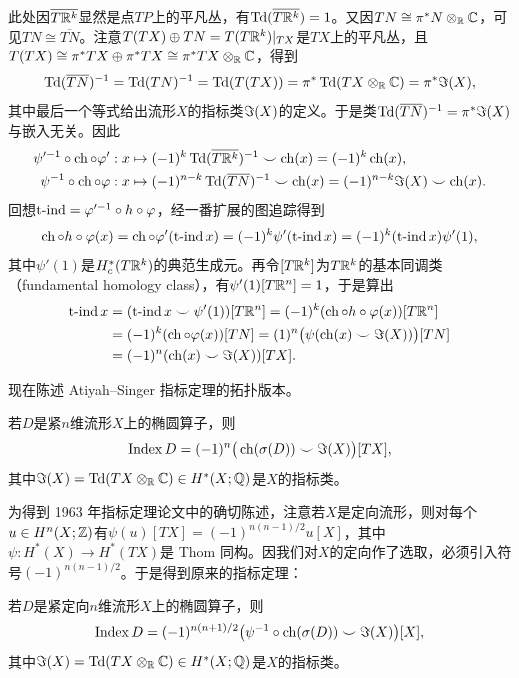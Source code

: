 此处因$\overline{T\mathbb{R}^k}$显然是点$TP$上的平凡丛，有$\operatorname{Td}(\overline{T\mathbb{R}^k})=1$。又因$TN\cong\pi^*N\otimes_{\mathbb{R}}\mathbb{C}$，可见$TN\cong\overline{TN}$。注意$T(TX)\oplus TN=T(T\mathbb{R}^k)|_{TX}$是$TX$上的平凡丛，且$T(TX)\cong\pi^*TX\oplus\pi^*TX\cong\pi^*TX\otimes_{\mathbb{R}}\mathbb{C}$，得到
\[
\operatorname{Td}(\overline{TN})^{-1}=\operatorname{Td}(TN)^{-1}=\operatorname{Td}(T(TX))=\pi^*\operatorname{Td}(TX\otimes_{\mathbb{R}}\mathbb{C})=\pi^*\Im(X),
\]
其中最后一个等式给出流形$X$的指标类$\Im(X)$的定义。于是类$\operatorname{Td}(\overline{TN})^{-1}=\pi^*\Im(X)$与嵌入无关。因此
\begin{align*}
\psi'^{-1}\circ\operatorname{ch}\circ\varphi'&:x\mapsto(-1)^k\operatorname{Td}(\overline{T\mathbb{R}^k})^{-1}\smile\operatorname{ch}(x)=(-1)^k\operatorname{ch}(x),\\
\psi^{-1}\circ\operatorname{ch}\circ\varphi&:x\mapsto(-1)^{n-k}\operatorname{Td}(\overline{TN})^{-1}\smile\operatorname{ch}(x)=(-1)^{n-k}\Im(X)\smile\operatorname{ch}(x).
\end{align*}
回想$\operatorname{t\text{-}ind}=\varphi'^{-1}\circ h\circ\varphi$，经一番扩展的图追踪得到
\[
\operatorname{ch}\circ h\circ\varphi(x)=\operatorname{ch}\circ\varphi'(\operatorname{t\text{-}ind} x)=(-1)^k\psi'(\operatorname{t\text{-}ind} x)=(-1)^k(\operatorname{t\text{-}ind} x)\psi'(1),
\]
其中$\psi'(1)$是$H^*_c(T\mathbb{R}^k)$的典范生成元。再令$[T\mathbb{R}^k]$为$T\mathbb{R}^k$的基本同调类（fundamental homology class），有$\psi'(1)[T\mathbb{R}^n]=1$，于是算出
\begin{align*}
\operatorname{t\text{-}ind} x&=(\operatorname{t\text{-}ind} x\smile\psi'(1))[T\mathbb{R}^n]=(-1)^k(\operatorname{ch}\circ h\circ\varphi(x))[T\mathbb{R}^n]\\
&=(-1)^k(\operatorname{ch}\circ\varphi(x))[TN]=(1)^n\big(\psi(\operatorname{ch}(x)\smile\Im(X))\big)[TN]\\
&=(-1)^n(\operatorname{ch}(x)\smile\Im(X))[TX].
\end{align*}


现在陈述 Atiyah–Singer 指标定理的拓扑版本。

\begin{theorem}[指标定理 A]
若$D$是紧$n$维流形$X$上的椭圆算子，则
\[
\operatorname{Index} D=(-1)^n\big(\operatorname{ch}(\sigma(D))\smile\Im(X)\big)[TX],
\]
其中$\Im(X)=\operatorname{Td}(TX\otimes_{\mathbb{R}}\mathbb{C})\in H^*(X;\mathbb{Q})$是$X$的指标类。
\end{theorem}

为得到 1963 年指标定理论文中的确切陈述，注意若$X$是定向流形，则对每个$u\in H^n(X;\mathbb{Z})$有$\psi(u)[TX]=(-1)^{n(n-1)/2}u[X]$，其中$\psi:H^*(X)\to H^*(TX)$是 Thom 同构。因我们对$X$的定向作了选取，必须引入符号$(-1)^{n(n-1)/2}$。于是得到原来的指标定理：

\begin{theorem}[指标定理 B]
若$D$是紧定向$n$维流形$X$上的椭圆算子，则
\[
\operatorname{Index} D=(-1)^{n(n+1)/2}\big(\psi^{-1}\circ\operatorname{ch}(\sigma(D))\smile\Im(X)\big)[X],
\]
其中$\Im(X)=\operatorname{Td}(TX\otimes_{\mathbb{R}}\mathbb{C})\in H^*(X;\mathbb{Q})$是$X$的指标类。
\end{theorem}

